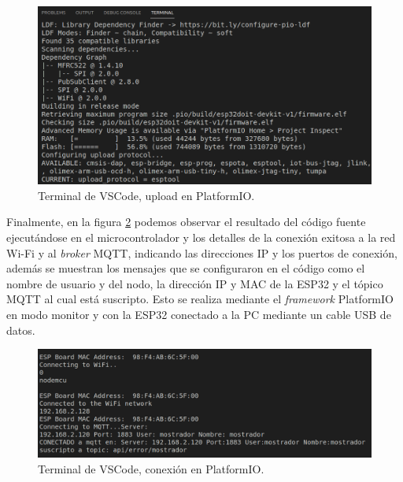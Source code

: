 \begin{figure}[H]
	\centering
	\includegraphics[width=\textwidth]{./Figures/platformio-upload.png}
	\caption{Terminal de VSCode, upload en PlatformIO.}
	\label{fig:platformio-upload}
\end{figure}

Finalmente, en la figura \ref{fig:platformio-connect} podemos observar el resultado del código fuente ejecutándose en el microcontrolador y los detalles de la conexión exitosa a la red Wi-Fi y al \textit{broker} MQTT, indicando las direcciones IP y los puertos de conexión, además se muestran los mensajes que se configuraron en el código como el nombre de usuario y del nodo, la dirección IP y MAC de la ESP32 y el tópico MQTT al cual está suscripto. Esto se realiza mediante el \textit{framework}
 PlatformIO en modo monitor y con la ESP32 conectado a la PC mediante un cable USB de datos.
 
\begin{figure}[H]
	\centering
	\includegraphics[width=\textwidth]{./Figures/platformio-connect.png}
	\caption{Terminal de VSCode, conexión en PlatformIO.}
	\label{fig:platformio-connect}
\end{figure}





